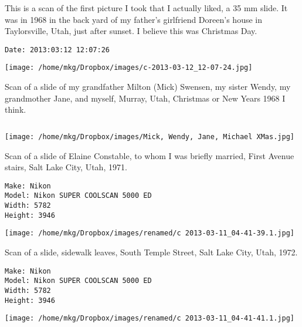 
\clearpage

\noindent This is a scan of the first picture I took that I actually liked, a 35 mm slide. It was in 1968 in the back yard of my father's girlfriend Doreen's house in Taylorsville, Utah, just after sunset. I believe this was Christmas Day.

\begin{lstlisting}
Date: 2013:03:12 12:07:26

\end{lstlisting}

\clearpage
\texttt{[image: /home/mkg/Dropbox/images/c-2013-03-12\_12-07-24.jpg]}

\clearpage

\noindent Scan of a slide of my grandfather Milton (Mick) Swensen, my sister Wendy, my grandmother Jane, and myself, Murray, Utah, Christmas or New Years 1968 I think.

\begin{lstlisting}

\end{lstlisting}

\clearpage
\texttt{[image: /home/mkg/Dropbox/images/Mick, Wendy, Jane, Michael XMas.jpg]}

\clearpage

\noindent Scan of a slide of Elaine Constable, to whom I was briefly married, First Avenue stairs, Salt Lake City, Utah, 1971.

\begin{lstlisting}
Make: Nikon
Model: Nikon SUPER COOLSCAN 5000 ED
Width: 5782
Height: 3946

\end{lstlisting}

\clearpage
\texttt{[image: /home/mkg/Dropbox/images/renamed/c 2013-03-11\_04-41-39.1.jpg]}

\clearpage

\noindent Scan of a slide, sidewalk leaves, South Temple Street, Salt Lake City, Utah, 1972.

\begin{lstlisting}
Make: Nikon
Model: Nikon SUPER COOLSCAN 5000 ED
Width: 5782
Height: 3946

\end{lstlisting}

\clearpage
\texttt{[image: /home/mkg/Dropbox/images/renamed/c 2013-03-11\_04-41-41.1.jpg]}

